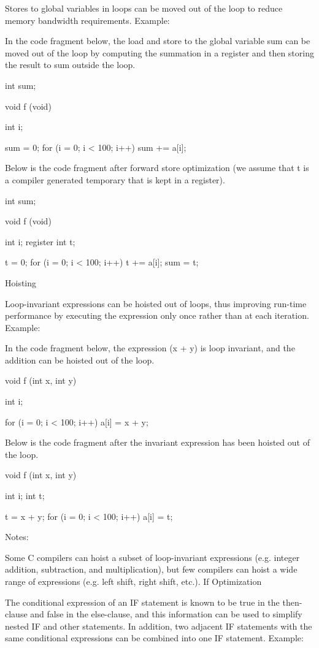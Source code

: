 {{{{{{{{{{Stores to global variables in loops can be moved out of the loop to reduce memory bandwidth requirements.
Example:

In the code fragment below, the load and store to the global variable sum can be moved out of the loop by computing the summation in a register and then storing the result to sum outside the loop.

    int sum;

    void f (void)
    {
      int i;

      sum = 0;
      for (i = 0; i < 100; i++)
        sum += a[i];
    }

Below is the code fragment after forward store optimization (we assume that t is a compiler generated temporary that is kept in a register).

    int sum;

    void f (void)
    {
      int i;
      register int t;

      t = 0;
      for (i = 0; i < 100; i++)
        t += a[i];
      sum = t;
    }

Hoisting

Loop-invariant expressions can be hoisted out of loops, thus improving run-time performance by executing the expression only once rather than at each iteration.
Example:

In the code fragment below, the expression (x + y) is loop invariant, and the addition can be hoisted out of the loop.

    void f (int x, int y)
    {
      int i;

      for (i = 0; i < 100; i++)
        {
          a[i] = x + y;
        }
    }

Below is the code fragment after the invariant expression has been hoisted out of the loop.

    void f (int x, int y)
    {
      int i;
      int t;

      t = x + y;
      for (i = 0; i < 100; i++)
        {
          a[i] = t;
        }
    }

Notes:

Some C compilers can hoist a subset of loop-invariant expressions (e.g. integer addition, subtraction, and multiplication), but few compilers can hoist a wide range of expressions (e.g. left shift, right shift, etc.). 
If Optimization

The conditional expression of an IF statement is known to be true in the then-clause and false in the else-clause, and this information can be used to simplify nested IF and other statements. In addition, two adjacent IF statements with the same conditional expressions can be combined into one IF statement.
Example:

}}}}}}}}}}
